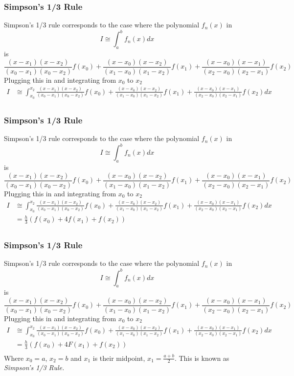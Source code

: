 \documentclass{if-beamer}
\begin{document}
\begin{frame}
	\frametitle{Simpson's 1/3 Rule}
	Simpson's 1/3 rule corresponds to the case where the polynomial $f_n(x)$ in
	$$I \cong \int_{a}^{b}f_n(x)dx $$
	is 
	$$\frac{(x-x_1)(x-x_2)}{(x_0-x_1)(x_0-x_2)}f(x_0) + \frac{(x-x_0)(x-x_2)}{(x_1-x_0)(x_1-x_2)}f(x_1) + \frac{(x-x_0)(x-x_1)}{(x_2-x_0)(x_2-x_1)}f(x_2)$$
	Plugging this in and integrating from $x_0$ to $x_2$
	\begin{align*}
		I &\cong \int_{x_0}^{x_2}\frac{(x-x_1)(x-x_2)}{(x_0-x_1)(x_0-x_2)}f(x_0) + \frac{(x-x_0)(x-x_2)}{(x_1-x_0)(x_1-x_2)}f(x_1) + \frac{(x-x_0)(x-x_1)}{(x_2-x_0)(x_2-x_1)}f(x_2)dx\\
	\end{align*}  
\end{frame}

\begin{frame}
	\frametitle{Simpson's 1/3 Rule}
	Simpson's 1/3 rule corresponds to the case where the polynomial $f_n(x)$ in
	$$I \cong \int_{a}^{b}f_n(x)dx $$
	is 
	$$\frac{(x-x_1)(x-x_2)}{(x_0-x_1)(x_0-x_2)}f(x_0) + \frac{(x-x_0)(x-x_2)}{(x_1-x_0)(x_1-x_2)}f(x_1) + \frac{(x-x_0)(x-x_1)}{(x_2-x_0)(x_2-x_1)}f(x_2)$$
	Plugging this in and integrating from $x_0$ to $x_2$
	\begin{align*}
		I &\cong \int_{x_0}^{x_2}\frac{(x-x_1)(x-x_2)}{(x_0-x_1)(x_0-x_2)}f(x_0) + \frac{(x-x_0)(x-x_2)}{(x_1-x_0)(x_1-x_2)}f(x_1) + \frac{(x-x_0)(x-x_1)}{(x_2-x_0)(x_2-x_1)}f(x_2)dx\\
		&=\frac{h}{3}(f(x_0)+4f(x_1)+f(x_2))\\
	\end{align*}  
\end{frame}
\begin{frame}
	\frametitle{Simpson's 1/3 Rule}
	Simpson's 1/3 rule corresponds to the case where the polynomial $f_n(x)$ in
	$$I \cong \int_{a}^{b}f_n(x)dx $$
	is 
	$$\frac{(x-x_1)(x-x_2)}{(x_0-x_1)(x_0-x_2)}f(x_0) + \frac{(x-x_0)(x-x_2)}{(x_1-x_0)(x_1-x_2)}f(x_1) + \frac{(x-x_0)(x-x_1)}{(x_2-x_0)(x_2-x_1)}f(x_2)$$
	Plugging this in and integrating from $x_0$ to $x_2$
	\begin{align*}
		I &\cong \int_{x_0}^{x_2}\frac{(x-x_1)(x-x_2)}{(x_0-x_1)(x_0-x_2)}f(x_0) + \frac{(x-x_0)(x-x_2)}{(x_1-x_0)(x_1-x_2)}f(x_1) + \frac{(x-x_0)(x-x_1)}{(x_2-x_0)(x_2-x_1)}f(x_2)dx\\
		&=\frac{h}{3}(f(x_0)+4F(x_1)+f(x_2))\\
	\end{align*}
	Where $x_0 = a$, $x_2 = b$ and $x_1$ is their midpoint, $x_1 = \frac{a+b}{2}$. This is known as \textit{Simpson's 1/3 Rule.} 
\end{frame}
\end{document}
